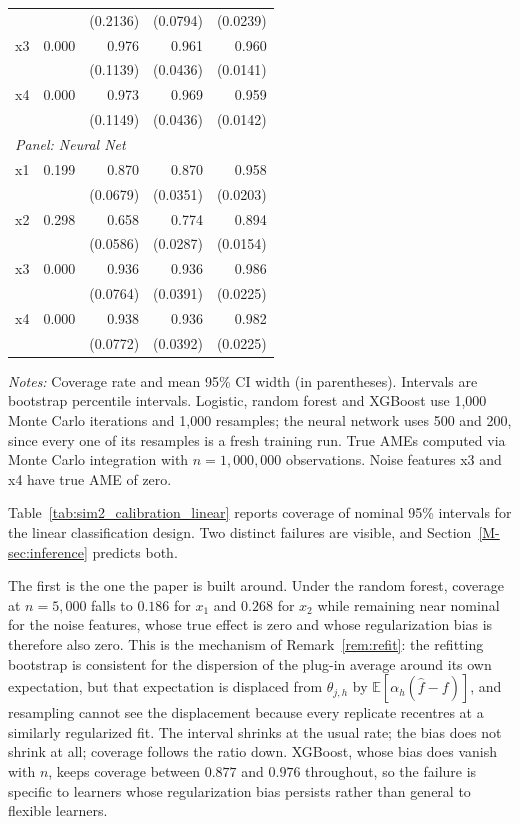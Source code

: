 \documentclass[12pt,a4paper]{article}
\numberwithin{equation}{section}
\theoremstyle{plain}
\theoremstyle{definition}
\newcommand{\E}{\mathbb{E}}
\begin{document}
\begin{table}[htbp]
\begin{threeparttable}
\begin{tabular}{lrrrr}
				&  & (0.2136) & (0.0794) & (0.0239) \\
				\quad x3 & 0.000 & 0.976 & 0.961 & 0.960 \\
				&  & (0.1139) & (0.0436) & (0.0141) \\
				\quad x4 & 0.000 & 0.973 & 0.969 & 0.959 \\
				&  & (0.1149) & (0.0436) & (0.0142) \\
				\midrule
				\multicolumn{5}{l}{\textit{Panel: Neural Net}} \\
				\quad x1 & 0.199 & 0.870 & 0.870 & 0.958 \\
				&  & (0.0679) & (0.0351) & (0.0203) \\
				\quad x2 & 0.298 & 0.658 & 0.774 & 0.894 \\
				&  & (0.0586) & (0.0287) & (0.0154) \\
				\quad x3 & 0.000 & 0.936 & 0.936 & 0.986 \\
				&  & (0.0764) & (0.0391) & (0.0225) \\
				\quad x4 & 0.000 & 0.938 & 0.936 & 0.982 \\
				&  & (0.0772) & (0.0392) & (0.0225) \\
				\bottomrule
				\end{tabular}
				\begin{tablenotes}
				\footnotesize
				\item \textit{Notes:} Coverage rate and mean 95\% CI width (in parentheses). Intervals are bootstrap percentile intervals. Logistic, random forest and XGBoost use 1{,}000 Monte Carlo iterations and 1{,}000 resamples; the neural network uses 500 and 200, since every one of its resamples is a fresh training run. True AMEs computed via Monte Carlo integration with $n=1{,}000{,}000$ observations. Noise features x3 and x4 have true AME of zero.
				\end{tablenotes}
		\end{threeparttable}
	\end{table}
	
	Table~\ref{tab:sim2_calibration_linear} reports coverage of nominal 95\% intervals for the linear classification design. Two distinct failures are visible, and Section~\ref{M-sec:inference} predicts both.
	
	The first is the one the paper is built around. Under the random forest, coverage at $n=5{,}000$ falls to $0.186$ for $x_1$ and $0.268$ for $x_2$ while remaining near nominal for the noise features, whose true effect is zero and whose regularization bias is therefore also zero. This is the mechanism of Remark~\ref{rem:refit}: the refitting bootstrap is consistent for the dispersion of the plug-in average around its own expectation, but that expectation is displaced from $\theta_{j,h}$ by $\E[\alpha_h(\hat f - f)]$, and resampling cannot see the displacement because every replicate recentres at a similarly regularized fit. The interval shrinks at the usual rate; the bias does not shrink at all; coverage follows the ratio down. XGBoost, whose bias does vanish with $n$, keeps coverage between $0.877$ and $0.976$ throughout, so the failure is specific to learners whose regularization bias persists rather than general to flexible learners.
	
\end{document}
